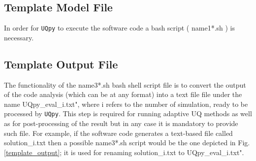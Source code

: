 \documentclass[preprint,12pt]{elsarticle}
\begin{document}
\subsection{Template Model File}

In order for \texttt{UQpy}  to execute the software code a bash script ({\color{red} name1*.sh} ) is necessary.  


\begin{figure}[!ht]
	\caption{}
	\label{template_model}
\end{figure}



\subsection{Template Output File}

The functionality of the {\color{red} name3*.sh} bash shell script file is to convert the output of the code analysis (which can be at any format) into a text file file under the name {\color{magenta} UQpy\_eval\_i.txt"}, where {\color{magenta} i} refers to the number of simulation,  ready to be processed by \texttt{UQpy}. This step is required for running adaptive UQ methods as well as for post-processing of the result but in any case it is mandatory to provide such file. For example, if the software code generates a text-based  file called {\color{magenta} solution\_i.txt} then a possible {\color{red} name3*.sh} script would be the one depicted in Fig.\ref{template_output};  it is used for renaming {\color{magenta} solution\_i.txt} to {\color{magenta} UQpy\_eval\_i.txt"}.
\end{document}
